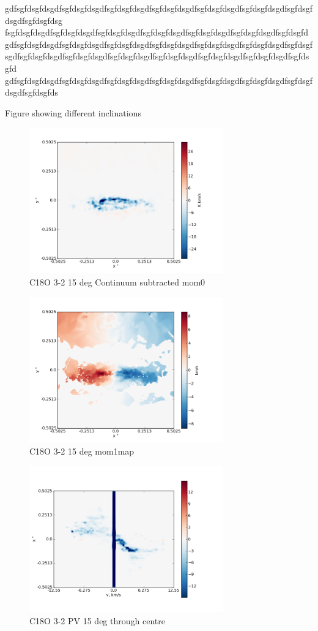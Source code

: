 \documentclass[useAMS,usenatbib]{mn2e}
\begin{document}
gdfsgfdsgfdsgdfsgfdsgfdsgdfsgfdsgfdsgdfsgfdsgfdsgdfsgfdsgfdsgdfsgfdsgfdsgdfsgfdsgfdsgdfsgfdsgfdsg fsgfdsgfdsgdfsgfdsgfdsgdfsgfdsgfdsgdfsgfdsgfdsgdfsgfdsgfdsgdfsgfdsgfdsgdfsgfdsgfd gdfsgfdsgfdsgdfsgfdsgfdsgdfsgfdsgfdsgdfsgfdsgfdsgdfsgfdsgfdsgdfsgfdsgfdsgdfsgfdsgf sgdfsgfdsgfdsgdfsgfdsgfdsgdfsgfdsgfdsgdfsgfdsgfdsgdfsgfdsgfdsgdfsgfdsgfdsgdfsgfdsgfd gdfsgfdsgfdsgdfsgfdsgfdsgdfsgfdsgfdsgdfsgfdsgfdsgdfsgfdsgfdsgdfsgfdsgfdsgdfsgfdsgfdsgdfsgfdsgfds

Figure showing different inclinations  

\begin{figure}
 \includegraphics[width=84mm]{Figures/sim/imageC18O_3-2_15deg_contSub.png}

 \caption{C18O 3-2 15 deg Continuum subtracted mom0}
\end{figure}

\begin{figure}
 \includegraphics[width=84mm]{Figures/sim/imageC18O_3-2_15deg_mom1.png}

 \caption{C18O 3-2 15 deg mom1map}
\end{figure}

\begin{figure}
 \includegraphics[width=84mm]{Figures/sim/imageC18O_3-2_15deg_PV_centre.png}

 \caption{C18O 3-2 PV 15 deg through centre}
\end{figure}
\end{document}
